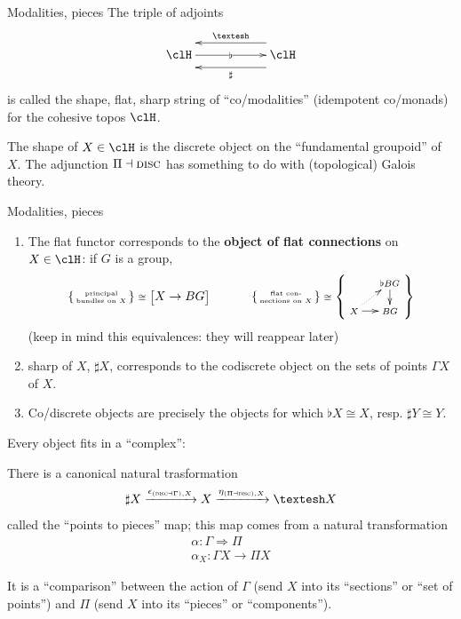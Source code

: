 \documentclass[presentation]{beamer}
\begin{document}
%
%
%
%
%
%
%
\begin{frame}{Modalities, pieces}
	The triple of adjoints
	\[
		\xymatrix@C=2cm{
		\clH
		\ar[r]|\flat
		\ar@{<-}@<10pt>[r]^\shape
		\ar@{<-}@<-10pt>[r]_\sharp &
		\clH
		}
	\]
	is called the \alert{shape, flat, sharp} string of ``co/modalities'' (idempotent co/monads) for the cohesive topos $\clH$.

	The \alert{shape} of $X \in\clH$ is the discrete object on the ``fundamental groupoid'' of $X$. The adjunction $\Pi\dashv\textsc{disc}$ has something to do with (topological) Galois theory.
\end{frame}
%
%
%
%
%
%
%
\begin{frame}{Modalities, pieces}
	\begin{enumerate}
		\item<+-> The \alert{flat} functor corresponds to the \textbf{object of flat connections} on $X\in \clH$: if $G$ is a group,
		      \[\scriptsize
			      \left\{
			      \begin{smallmatrix}
				      \text{principal}\\
				      \text{bundles on $X$}
			      \end{smallmatrix}
			      \right\} \cong \Big[ X \to BG \Big]\qquad\qquad
			      \left\{
			      \begin{smallmatrix}
				      \text{flat con-}\\
				      \text{nections on $X$}
			      \end{smallmatrix}
			      \right\}
			      \cong\left\{
			      \vcenter{\xymatrix@R=4mm@C=4mm{
			      & \flat BG \ar[d]\\
			      X \ar[r]\ar@{.>}[ur]& BG
			      }}\right\}
		      \]
					(keep in mind this equivalences: they will reappear later)
		\item<+-> \alert{sharp} of $X$, $\sharp X$, corresponds to the codiscrete object on the sets of \alert{points} $\Gamma X$ of $X$.
		\item<+-> Co/discrete objects are precisely the objects for which $\flat X \cong X$, resp. $\sharp Y \cong Y$.
	\end{enumerate}
\end{frame}
%
%
%
%
%
%
%
\begin{frame}
	Every object fits in a ``complex'':
	\onslide<+->
	\begin{df}
		There is a canonical natural trasformation
		\[
			\sharp X \xto{\epsilon_{(\disc\dashv\Gamma),X}} X \xto{\eta_{(\Pi\dashv\disc),X}} \shape X
		\]
		called the ``\alert{points to pieces}'' map; \onslide<+-> this map comes from a natural transformation
		\begin{gather*}
			\alpha : \Gamma \Rightarrow \Pi \\ \alpha_X : \Gamma X \to \Pi X
		\end{gather*}
	\end{df}
	\onslide<+->
	It is a ``comparison'' between the action of $\Gamma$ (send $X$ into its ``sections'' or ``set of points'') and $\Pi$ (send $X$ into its ``pieces'' or ``components'').
\end{frame}
\end{document}
